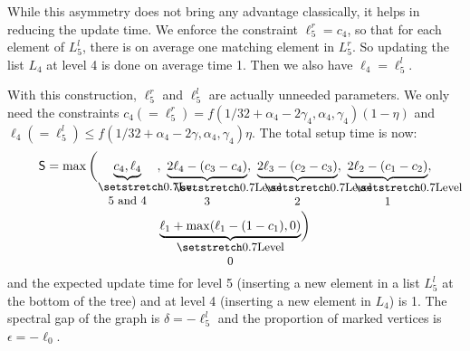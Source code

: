 

While this asymmetry does not bring any advantage classically, it helps in reducing the update time. We enforce the constraint $\ell_5^r = c_4$, so that for each element of $L_5^l$, there is on average one matching element in $L_5^r$. So updating the list $L_4$ at level 4 is done on average time 1. Then we also have $\ell_4 = \ell_5^l$.



With this construction, $\ell_5^r$ and $\ell_5^l$ are actually unneeded parameters. We only need the constraints $c_4 (= \ell_5^r) = f(1/32+\alpha_4-2\gamma_4, \alpha_4, \gamma_4) (1 - \eta)$ and $\ell_4 (= \ell_5^l) \leq f(1/32+\alpha_4-2\gamma, \alpha_4, \gamma_4) \eta$. The total setup time is now:
\begin{multline*}
\mathsf{S} = \max \bigg( \undertext[1]{Lv. 5 and 4}{ c_4, \ell_4 },~\undertext{Level 3}{2\ell_4  - (c_3 - c_4)},~\undertext{Level 2}{2\ell_3  - (c_2 - c_3)},~\undertext{Level 1}{2\ell_2 - (c_1 - c_2)}, \\
\undertext{Level 0}{\ell_1 + \max(\ell_1 - (1-c_1), 0) } \bigg)
\end{multline*}
and the expected update time for level 5 (inserting a new element in a list $L_5^l$ at the bottom of the tree) and at level 4 (inserting a new element in $L_4$) is 1. The spectral gap of the graph is $\delta = - \ell_5^l $
and the proportion of marked vertices is $\epsilon = -\ell_0$.

